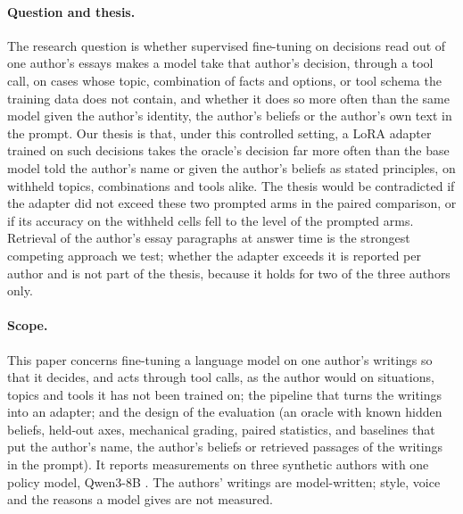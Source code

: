 \paragraph{Question and thesis.}
The research question is whether supervised fine-tuning on decisions read out of one author's
essays makes a model take that author's decision, through a tool call, on cases whose topic,
combination of facts and options, or tool schema the training data does not contain, and
whether it does so more often than the same model given the author's identity, the author's
beliefs or the author's own text in the prompt. Our thesis is that, under this controlled
setting, a LoRA adapter trained on such decisions takes the oracle's decision far more often
than the base model told the author's name or given the author's beliefs as stated
principles, on withheld topics, combinations and tools alike. The thesis would be contradicted
if the adapter did not exceed these two prompted arms in the paired comparison, or if its
accuracy on the withheld cells fell to the level of the prompted arms. Retrieval of the
author's essay paragraphs at answer time is the strongest competing approach we test; whether
the adapter exceeds it is reported per author and is not part of the thesis, because it holds
for two of the three authors only.

\paragraph{Scope.}
This paper concerns fine-tuning a language model on one author's writings so that it
decides, and acts through tool calls, as the author would on situations, topics and tools it
has not been trained on; the pipeline that turns the writings into an adapter; and the design
of the evaluation (an oracle with known hidden beliefs, held-out axes, mechanical grading,
paired statistics, and baselines that put the author's name, the author's beliefs or retrieved
passages of the writings in the prompt). It reports measurements on three synthetic authors
with one policy model, Qwen3-8B \citep{yang2025qwen3}. The authors' writings are
model-written; style, voice and the reasons a model gives are not measured.


